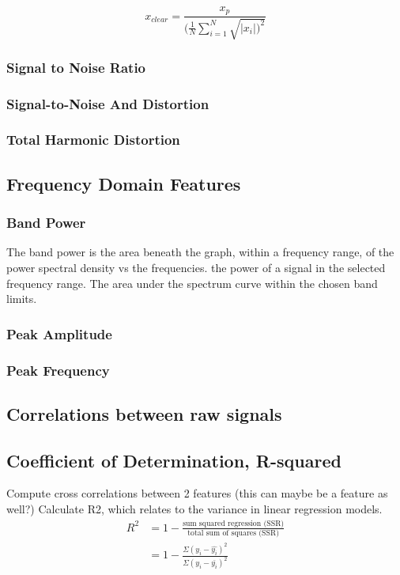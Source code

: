 \documentclass{article}
\begin{document}
$$ x_{clear} = \frac{x_p}{(\frac{1}{N}\sum^N_{i=1}\sqrt{|x_i|)^2}} $$
\subsubsection{Signal to Noise Ratio}

\subsubsection{Signal-to-Noise And Distortion}

\subsubsection{Total Harmonic Distortion}
   
\subsection{Frequency Domain Features}
\subsubsection{Band Power}
The band power is the area beneath the graph, within a frequency range, of the power spectral density vs the frequencies.
the power of a signal in the selected frequency range.
The area under the spectrum curve within the chosen band limits.
\subsubsection{Peak Amplitude}

\subsubsection{Peak Frequency}

\subsection{Correlations between raw signals}
\subsection{Coefficient of Determination, R-squared}
Compute cross correlations between 2 features (this can maybe be a feature as well?)
Calculate R2, which relates to the variance in linear regression models.
\begin{align*}
 R^2 &= 1 - \frac{\textrm{sum squared regression (SSR)}}{\textrm{total sum of squares (SSR)}} \\ 
 &= 1 - \frac{\Sigma(y_i - \hat{y_i})^2}{\Sigma(y_i - \bar{y_i})^2} 
\end{align*}
\end{document}
